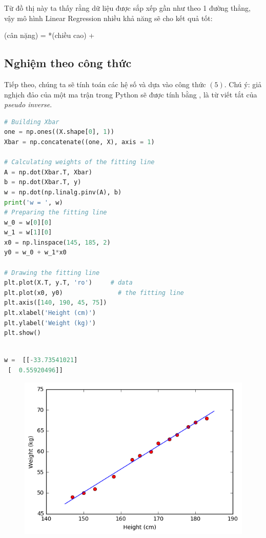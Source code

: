 Từ đồ thị này ta thấy rằng dữ liệu được sắp xếp gần như theo 1 đường thẳng, vậy mô hình Linear Regression nhiều khả năng sẽ cho kết quả tốt: 
 
(cân nặng) = *(chiều cao) +  
 
 
\subsection{Nghiệm theo công thức}
 
Tiếp theo, chúng ta sẽ tính toán các hệ số  và  dựa vào công thức $(5)$. Chú ý: giả nghịch đảo của một ma trận  trong Python sẽ được tính bằng ,  là từ viết tắt của \textit{pseudo inverse}. 
 
\begin{lstlisting}[language=Python]
# Building Xbar  
one = np.ones((X.shape[0], 1)) 
Xbar = np.concatenate((one, X), axis = 1) 
 
# Calculating weights of the fitting line  
A = np.dot(Xbar.T, Xbar) 
b = np.dot(Xbar.T, y) 
w = np.dot(np.linalg.pinv(A), b) 
print('w = ', w) 
# Preparing the fitting line  
w_0 = w[0][0] 
w_1 = w[1][0] 
x0 = np.linspace(145, 185, 2) 
y0 = w_0 + w_1*x0 
 
# Drawing the fitting line  
plt.plot(X.T, y.T, 'ro')     # data  
plt.plot(x0, y0)               # the fitting line 
plt.axis([140, 190, 45, 75]) 
plt.xlabel('Height (cm)') 
plt.ylabel('Weight (kg)') 
plt.show() 
 
\end{lstlisting}
 
\begin{lstlisting}[language=Python]
w =  [[-33.73541021] 
 [  0.55920496]] 
\end{lstlisting}
 
 


\begin{figure}
	\centering
	\includegraphics[width = \textwidth]{../LR/output_5_1.png}
\end{figure}
 
